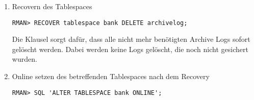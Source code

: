 \begin{enumerate}
            \item Recovern des Tablespaces
              \begin{lstlisting}[caption={Recovery des Tablespaces},label=admin1459,language=rman]
RMAN> RECOVER tablespace bank DELETE archivelog;
              \end{lstlisting}
              Die Klausel  sorgt daf\"ur, dass alle nicht mehr ben\"otigten Archive Logs sofort gel\"oscht werden. Dabei werden keine Logs gel\"oscht, die noch nicht gesichert wurden.
            \item Online setzen des betreffenden Tablespaces nach dem Recovery
              \begin{lstlisting}[caption={Betreffenden Tablespace Online setzen},label=admin1460,language=rman,emph={[10]ALTER,TABLESPACE,ONLINE},emphstyle={[10]\color{magenta}\bfseries}]
RMAN> SQL 'ALTER TABLESPACE bank ONLINE';
              \end{lstlisting}
          \end{enumerate}
